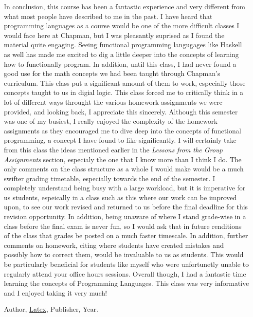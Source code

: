 \documentclass{article}
\theoremstyle{theorem}
\theoremstyle{definition}
\theoremstyle{remark}
\begin{document}
  In conclusion, this course has been a fantastic experience and very different from what most people have described 
  to me in the past. I have heard that programming languages as a course would be one of the more difficult classes 
  I would face here at Chapman, but I was pleasantly suprised as I found the material quite engaging. Seeing functional 
  programming langugages like Haskell as well has made me excited to dig a little deeper into the concepts of learning 
  how to functionally program. In addition, until this class, I had never found a good use for the math concepts we 
  had been taught through Chapman's curriculum. This class put a significant amount of them to work, especially those 
  concepts taught to us in digial logic. This class forced me to critically think in a lot of different ways throught 
  the various homework assignments we were provided, and looking back, I appreciate this sincerely. Although this semester 
  was one of my busiest, I really enjoyed the complexity of the homework assignments as they encouraged me to dive deep 
  into the concepts of functional programming, a concept I have found to like significantly. I will certainly take from 
  this class the ideas mentioned earlier in the \emph{Lessons from the Group Assignments} section, especialy the one that 
  I know more than I think I do. The only comments on the class structure as a whole I would make would be a much swifter 
  grading timetable, especially towards the end of the semester. I completely understand being busy with a large 
  workload, but it is imperative for us students, espeically in a class such as this where our work can be improved upon, 
  to see our work revised and returned to us before the final deadline for this revision opportunity. In addition, 
  being unaware of where I stand grade-wise in a class before the final exam is never fun, so I would ask that in 
  future renditions of the class that grades be posted on a much faster timescale. In addition, further comments on 
  homework, citing where students have created mistakes and possibly how to correct them, would be invaluable to us 
  as students. This would be particularly beneficial for students like myself who were unfortunetly unable to regularly 
  attend your office hours sessions. Overall though, I had a fantastic time learning the concepts of Programming Languages. 
  This class was very informative and I enjoyed taking it very much!
  
  
  \begin{thebibliography}{99}
   Author, \href{https://en.wikipedia.org/wiki/LaTeX}{Latex}, Publisher, Year.
  \end{thebibliography}
\end{document}
